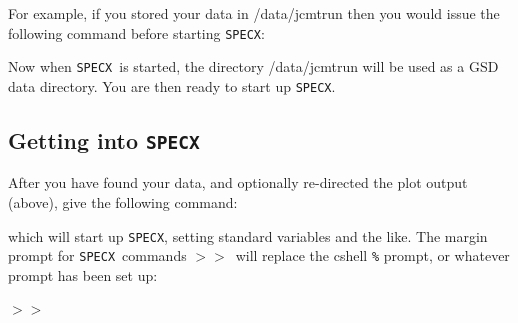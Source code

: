 \documentclass[11pt,twoside]{starlink}
\providecommand{\SPECX}{\texttt{SPECX}}
\providecommand{\SP}{{$>\!>$}}
\begin{document}
For example, if you stored your data in /data/jcmtrun then you would issue the
following command before starting \SPECX:

\begin{terminalv}
\end{terminalv}

Now when \SPECX\ is started, the directory /data/jcmtrun will be used as
a GSD data directory. You are then ready to start up \SPECX .

\subsection{Getting into \SPECX }
\label{sec:starting-specx}
After you have found your data, and optionally re-directed the plot
output (above), give the following command:

\begin{terminalv}
\end{terminalv}

which will start up \SPECX , setting standard variables and the
like. The margin prompt for \SPECX\ commands \SP\ will replace the cshell
\texttt{\%} prompt, or whatever prompt has been set up:

\SP
\end{document}
